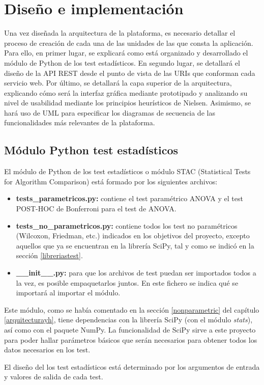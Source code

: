 \chapter{Diseño e implementación}
Una vez diseñada la arquitectura de la plataforma, es necesario detallar el proceso de creación de cada una de las unidades de las que consta la aplicación. Para ello, en primer lugar, se explicará como está organizado y desarrollado el módulo de Python de los test estadísticos. En segundo lugar, se detallará el diseño de la API REST desde el punto de vista de las URIs que conforman cada servicio web. Por último, se detallará la capa superior de la arquitectura, explicando cómo será la interfaz gráfica mediante prototipado y analizando su nivel de usabilidad mediante los principios heurísticos de Nielsen. Asimismo, se hará uso de UML para especificar los diagramas de secuencia de las funcionalidades más relevantes de la plataforma.

\section{Módulo Python test estadísticos} \label{dis_py}
El módulo de Python de los test estadísticos o módulo STAC (Statistical Tests for Algorithm Comparison) está formado por los siguientes archivos:
\begin{itemize}
\item \textbf{tests\_parametricos.py:} contiene el test paramétrico ANOVA y el test POST-HOC de Bonferroni para el test de ANOVA.
\item \textbf{tests\_no\_parametricos.py:} contiene todos los test no paramétricos (Wilcoxon, Friedman, etc.) indicados en los objetivos del proyecto, excepto aquellos que ya se encuentran en la librería SciPy, tal y como se indicó en la sección \ref{libreriastest}.
\item \textbf{\_\_init\_\_.py:} para que los archivos de test puedan ser importados todos a la vez, es posible empaquetarlos juntos. En este fichero se indica qué se importará al importar el módulo.
\end{itemize}
Este módulo, como se había comentado en la sección \ref{nonparametric} del capítulo \ref{arquitecturayh}, tiene dependencias con la librería SciPy (con el módulo \textit{stats}), así como con el paquete NumPy. La funcionalidad de SciPy sirve a este proyecto para poder hallar parámetros básicos que serán necesarios para obtener todos los datos necesarios en los test.

El diseño del los test estadísticos está determinado por los argumentos de entrada y valores de salida de cada test.

